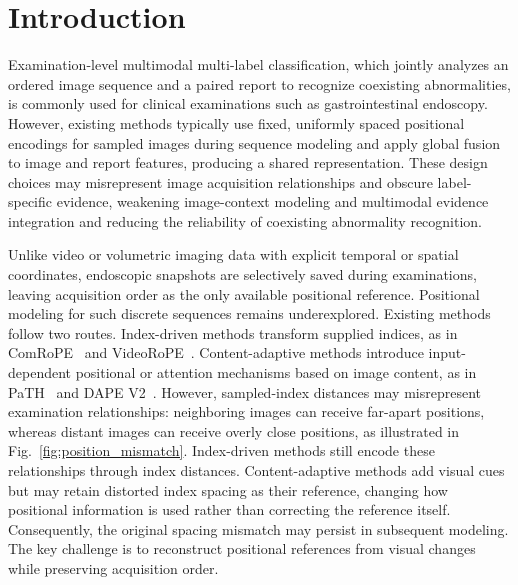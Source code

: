 \section{Introduction}
\label{sec:intro}




Examination-level multimodal multi-label classification, which jointly analyzes an ordered image sequence and a paired report to recognize coexisting abnormalities, is commonly used for clinical examinations such as gastrointestinal endoscopy. However, existing methods typically use fixed, uniformly spaced positional encodings for sampled images during sequence modeling and apply global fusion to image and report features, producing a shared representation. These design choices may misrepresent image acquisition relationships and obscure label-specific evidence, weakening image-context modeling and multimodal evidence integration and reducing the reliability of coexisting abnormality recognition.


Unlike video or volumetric imaging data with explicit temporal or spatial coordinates, endoscopic snapshots are selectively saved during examinations, leaving acquisition order as the only available positional reference. Positional modeling for such discrete sequences remains underexplored. Existing methods follow two routes. Index-driven methods transform supplied indices, as in ComRoPE~\cite{yu2025comrope} and VideoRoPE~\cite{wei2025videorope}. Content-adaptive methods introduce input-dependent positional or attention mechanisms based on image content, as in PaTH~\cite{yang2025path} and DAPE V2~\cite{zheng2025dapev2}. However, sampled-index distances may misrepresent examination relationships: neighboring images can receive far-apart positions, whereas distant images can receive overly close positions, as illustrated in Fig.~\ref{fig:position_mismatch}. Index-driven methods still encode these relationships through index distances. Content-adaptive methods add visual cues but may retain distorted index spacing as their reference, changing how positional information is used rather than correcting the reference itself. Consequently, the original spacing mismatch may persist in subsequent modeling. The key challenge is to reconstruct positional references from visual changes while preserving acquisition order.

